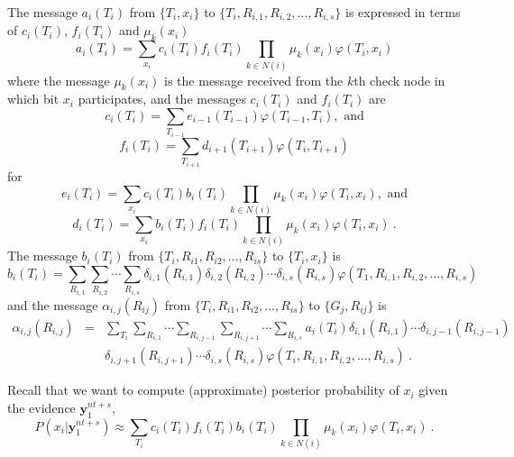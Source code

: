 The message $a_i(T_i)$ from $\{T_{i},x_i\}$ to $\{T_i,
R_{i,1},R_{i,2},\dots, R_{i,s}\}$ is expressed in terms of
$c_i(T_i)$, $f_i(T_i)$ and $\mu_k(x_i)$
\begin{equation}
a_i(T_i)=\sum_{x_i}c_i(T_i)f_i(T_i) \prod_{k \in N(i)} \mu_k(x_i)
\varphi(T_i,x_i)
\end{equation}
where the message $\mu_k(x_i)$ is the message received from the
$k$th check node in which bit $x_i$ participates, and the messages
$c_i(T_i)$ and $f_i(T_i)$ are
\begin{equation}
c_i(T_i)=\sum_{T_{i-1}}e_{i-1}(T_{i-1})\varphi(T_{i-1},T_{i}),
\text{ and}
\end{equation}
\begin{equation}
f_i(T_i)=\sum_{T_{i+1}}d_{i+1}(T_{i+1})\varphi(T_{i},T_{i+1})
\end{equation}
for
\begin{equation}
e_i(T_i)=\sum_{x_i}c_i(T_i)b_i(T_i) \prod_{k \in N(i)}
\mu_k(x_i)\varphi(T_i,x_i), \text{ and}
\end{equation}
\begin{equation}
d_i(T_i)=\sum_{x_i}b_i(T_i)f_i(T_i) \prod_{k \in N(i)} \mu_k(x_i)
\varphi(T_i,x_i)~.
\end{equation}
The message $b_i(T_i)$ from $\{T_i, R_{i1},R_{i2},\dots,R_{is}\}$ to
$\{T_i,x_i\}$ is
\begin{equation}
b_i(T_i)=\sum_{R_{i,1}}\sum_{R_{i,2}}\cdots\sum_{R_{i,s}}
\delta_{i,1}(R_{i,1})\delta_{i,2}(R_{i,2})\cdots\delta_{i,s}(R_{i,s})
\varphi(T_1,R_{i,1},R_{i,2},\dots,R_{i,s})
\end{equation}
and the message $\alpha_{i,j}(R_{ij})$ from $\{T_i,
R_{i1},R_{i2},\dots,R_{is}\}$ to $\{G_j,R_{ij}\}$ is
\begin{equation}\begin{array}{lll}
\alpha_{i,j}(R_{i,j})&=&\sum_{T_i}\sum_{R_{i,1}}\cdots\sum_{R_{i,j-1}}\sum_{R_{i,j+1}}\cdots\sum_{R_{i,s}}
a_i(T_i)\delta_{i,1}(R_{i,1})\cdots\delta_{i,j-1}(R_{i,j-1})\\
{}&{}&\delta_{i,j+1}(R_{i,j+1})\cdots\delta_{i,s}(R_{i,s})
\varphi(T_i,R_{i,1},R_{i,2},\dots,R_{i,s})~.
\end{array}\end{equation}


Recall that we want to compute (approximate) posterior probability
of $x_i$ given the evidence $\mathbf{y}_1^{nt+s}$,
\begin{equation}
P(x_i|\mathbf{y}_1^{nt+s}) \approx \sum_{T_i}
c_i(T_i)f_i(T_i)b_i(T_i)\prod_{k \in N(i)} \mu_k(x_i)
\varphi(T_i,x_i)~.
\end{equation}

